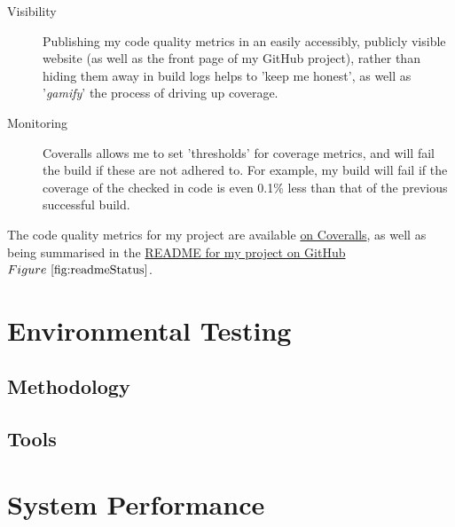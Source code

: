 \begin{description}
  \item[Visibility] Publishing my code quality metrics in an easily accessibly,
  publicly visible website (as well as the front page of my GitHub project),
  rather than hiding them away in build logs helps to 'keep me honest', as well
  as '\textit{\gls{gamify}}' the process of driving up coverage.
  \item[Monitoring] Coveralls allows me to set 'thresholds' for coverage
  metrics, and will fail the build if these are not adhered to. For example, my
  build will fail if the coverage of the checked in code is even 0.1\% less than
  that of the previous successful build.
\end{description}

The code quality metrics for my project are available
\href{https://coveralls.io/github/FireEater64/gamq?branch=master}{on Coveralls},
as well as being summarised in the
\href{https://github.com/FireEater64/gamq/blob/master/README.md}{README for my
project on GitHub}\(Figure~\ref{fig:readmeStatus} \).


\section{Environmental Testing}
\label{sec:Environmental Testing}


\subsection{Methodology}
\label{sub:Methodology}


\subsection{Tools}
\label{sub:Tools}


\section{System Performance}
\label{sec:System Performance}

